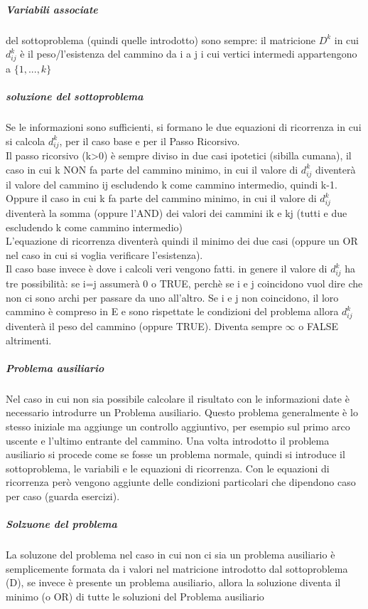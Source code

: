 \documentclass[12pt, a4paper, openany]{book}
\begin{document}
\subparagraph{Variabili associate} del sottoproblema (quindi quelle introdotto) sono sempre: il matricione $D^k$ in cui $d^k_{ij}$ è il peso/l'esistenza del cammino da i a j
i cui vertici intermedi appartengono a $\{1,...,k\}$

\subparagraph{soluzione del sottoproblema}
Se le informazioni sono sufficienti, si formano le due equazioni di ricorrenza in cui si calcola $d^k_{ij}$, per il caso base e per il Passo Ricorsivo.
\\Il passo ricorsivo (k>0) è sempre diviso in due casi ipotetici (sibilla cumana), il caso in cui k NON fa parte del cammino minimo, in cui il valore di $d^k_{ij}$ diventerà
il valore del cammino ij escludendo k come cammino intermedio, quindi k-1.\\Oppure il caso in cui k fa parte del cammino minimo, in cui il valore di $d^k_{ij}$ diventerà la somma (oppure l'AND) dei valori dei cammini ik e kj (tutti e due escludendo k come cammino intermedio)
\\L'equazione di ricorrenza diventerà quindi il minimo dei due casi (oppure un OR nel caso in cui si voglia verificare l'esistenza).\\
Il caso base invece è dove i calcoli veri vengono fatti. in genere il valore di $d^k_{ij}$ ha tre possibilità: se i=j assumerà 0 o TRUE, perchè se i e j coincidono vuol dire che non ci sono archi per passare da uno all'altro.
Se i e j non coincidono, il loro cammino è compreso in E e sono rispettate le condizioni del problema allora $d^k_{ij}$ diventerà il peso del cammino (oppure TRUE). Diventa sempre $\infty$ o FALSE altrimenti.


\subparagraph{Problema ausiliario} Nel caso in cui non sia possibile calcolare il risultato con le informazioni date è necessario introdurre un Problema ausiliario.
Questo problema generalmente è lo stesso iniziale ma aggiunge un controllo aggiuntivo, per esempio sul primo arco uscente e l'ultimo entrante del cammino.
Una volta introdotto il problema ausiliario si procede come se fosse un problema normale, quindi si introduce il sottoproblema, le variabili e le equazioni di ricorrenza.
Con le equazioni di ricorrenza però vengono aggiunte delle condizioni particolari che dipendono caso per caso (guarda esercizi).

\subparagraph{Solzuone del problema} La soluzone del problema nel caso in cui non ci sia un problema ausiliario è semplicemente formata da i valori nel matricione introdotto dal sottoproblema (D),
se invece è presente un problema ausiliario, allora la soluzione diventa il minimo (o OR) di tutte le soluzioni del Problema ausiliario
\end{document}
